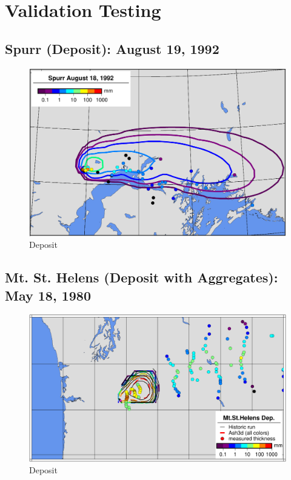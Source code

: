 \clearpage
\section{Validation Testing}
\subsection{Spurr (Deposit): August 19, 1992}
\begin{figure}[htbp]
\includegraphics[angle=0,scale=0.6]{Figures/TestCase_Results/ValidTest/Spurr_Deposit.pdf}
\parbox{15cm}{\caption{\label{FigTestValSpurr} Deposit}}
\end{figure}

\clearpage
\subsection{Mt. St. Helens (Deposit with Aggregates): May 18, 1980}
\begin{figure}[htbp]
\includegraphics[angle=0,scale=0.6]{Figures/TestCase_Results/ValidTest/MSH_Deposit.pdf}
\parbox{15cm}{\caption{\label{FigTestValMSH} Deposit}}
\end{figure}

